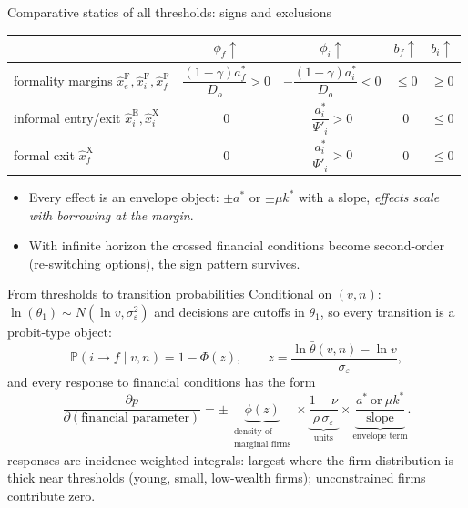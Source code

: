\documentclass[11pt,aspectratio=169]{beamer}
\providecommand{\infml}{i}
\providecommand{\fml}{f}
\providecommand{\curv}{\gamma}
\providecommand{\spread}[1]{\phi_{#1}}
\providecommand{\collat}[1]{b_{#1}}
\providecommand{\netw}{n}
\providecommand{\thF}[1]{\hat{x}^{\mathrm{F}}_{#1}}
\providecommand{\thX}[1]{\hat{x}^{\mathrm{X}}_{#1}}
\providecommand{\thE}[1]{\hat{x}^{\mathrm{E}}_{#1}}
\providecommand{\Prob}{\mathbb{P}}
\begin{document}
\begin{frame}{Comparative statics of all thresholds: signs and exclusions}
\begin{center}
\renewcommand{\arraystretch}{1.55}\small
\begin{tabular}{lcccc}
\toprule
 & $\spread{\fml}\uparrow$ & $\spread{\infml}\uparrow$ &
 $\collat{\fml}\uparrow$ & $\collat{\infml}\uparrow$ \\
\midrule
formality margins $\thF{e},\thF{\infml},\thF{\fml}$ &
$\dfrac{(1-\curv)a^{*}_{\fml}}{D_{o}}>0$ &
$-\dfrac{(1-\curv)a^{*}_{\infml}}{D_{o}}<0$ & $\leq0$ & $\geq0$ \\
informal entry/exit $\thE{\infml},\thX{\infml}$ & $0$ &
$\dfrac{a^{*}_{\infml}}{\Psi'_{\infml}}>0$ & $0$ & $\leq0$ \\
formal exit $\thX{\fml}$ & $0$ &
$\dfrac{a^{*}_{\infml}}{\Psi'_{\infml}}>0$ & $0$ & $\leq0$ \\
\bottomrule
\end{tabular}
\end{center}
\medskip
\begin{itemize}
  \item Every effect is an envelope object: $\pm a^{*}$ or $\pm\mu k^{*}$ with a slope, \emph{effects scale with borrowing at the margin}.
  \item With infinite horizon the crossed financial conditions become second-order (re-switching options), the sign pattern survives.
\end{itemize}
\end{frame}
 
\begin{frame}{From thresholds to transition probabilities}
Conditional on $(v,\netw)$: $\ln(\theta_{1})\sim N(\ln v,
\sigma_{\varepsilon}^{2})$ and decisions are cutoffs in $\theta_{1}$,
so every transition is a probit-type object:
\begin{equation*}
  \Prob(\infml\to\fml\mid v,\netw)=1-\Phi(z),\qquad
  z=\frac{\ln\bar\theta(v,\netw)-\ln v}{\sigma_{\varepsilon}},
\end{equation*}
and every response to financial conditions has the form
\begin{equation*}
  \frac{\partial p}{\partial(\text{financial parameter})}
  =\pm\,\underbrace{\phi(z)}_{\substack{\text{density of}\\
  \text{marginal firms}}}\times
  \underbrace{\frac{1-\nu}{\rho\,\sigma_{\varepsilon}}}_{\text{units}}
  \times
  \underbrace{\frac{a^{*}\ \text{or}\ \mu k^{*}}{\text{slope}}}
  _{\text{envelope term}} .
\end{equation*}
 responses are incidence-weighted integrals: largest where the firm distribution is thick near thresholds
(young, small, low-wealth firms); unconstrained firms contribute
zero.
\end{frame}
 
\end{document}
